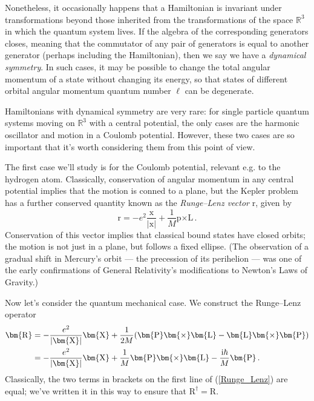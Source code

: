 \documentclass{article}
\theoremstyle{plain}\theoremheaderfont{\normalfont\itshape}\theorembodyfont{\rmfamily}\theoremseparator{.}\newtheorem*{rem}{Remark}\newtheorem*{ex}{Example}\newtheorem*{proof}{Proof}\newtheorem*{altp}{Alternative proof}
\theoremstyle{plain}\theoremheaderfont{\normalfont\bfseries}\theorembodyfont{\rmfamily}\theoremseparator{.}\newtheorem{thm}{Theorem}[section]\newtheorem{lem}[thm]{Lemma}\newtheorem{prop}[thm]{Proposition}\newtheorem*{cor}{Corollary}\newtheorem{defn}[thm]{Definition}\newtheorem{clm}[thm]{Claim}\newtheorem{clminproof}{Claim}
\theoremstyle{break}\theoremheaderfont{\normalfont\itshape}\theorembodyfont{\rmfamily}\theoremseparator{.\medskip}\newtheorem*{proofskip}{Proof}\newtheorem*{exs}{Examples}\newtheorem*{rems}{Remarks}
\theoremstyle{break}\theoremheaderfont{\normalfont\bfseries}\theorembodyfont{\rmfamily}\theoremseparator{.\medskip}\newtheorem{lemskip}[thm]{Lemma}\newtheorem{defnskip}[thm]{Definition}\newtheorem{propskip}[thm]{Proposition}\newtheorem{thmskip}[thm]{Theorem}
\numberwithin{equation}{section}
\newcommand{\ii}{\mathrm{i}}
\newcommand{\vb}[1]{\bm{\mathrm{#1}}}
\newcommand{\cross}{\bm{\times}}
\newcommand{\abs}[1]{\left| #1 \right|}
\newcommand{\RR}{\mathbb{R}}
\begin{document}
    Nonetheless, it occasionally happens that a Hamiltonian is invariant under transformations beyond those inherited from the transformations of the space \(\RR^3\) in which the quantum system lives. If the algebra of the corresponding generators closes, meaning that the commutator of any pair of generators is equal to another generator (perhaps including the Hamiltonian), then we say we have a \textit{dynamical symmetry}. In such cases, it may be possible to change the total angular momentum of a state without changing its energy, so that states of different orbital angular momentum quantum number \(\ell\) can be degenerate.

    Hamiltonians with dynamical symmetry are very rare: for single particle quantum systems moving on \(\RR^3\) with a central potential, the only cases are the harmonic oscillator and motion in a Coulomb potential. However, these two cases are so important that it's worth considering them from this point of view.

    The first case we'll study is for the Coulomb potential, relevant e.g. to the hydrogen atom. Classically, conservation of angular momentum in any central potential implies that the motion is conned to a plane, but the Kepler problem has a further conserved quantity known as the \textit{Runge--Lenz vector} \(\vb{r}\), given by
    \begin{equation}
        \vb{r}=-e^2\frac{\vb{x}}{\abs{\vb{x}}}+\frac{1}{M}\vb{p}\cross\vb{L}\,.
    \end{equation}
    Conservation of this vector implies that classical bound states have closed orbits; the motion is not just in a plane, but follows a fixed ellipse. (The observation of a gradual shift in Mercury's orbit --- the precession of its perihelion --- was one of the early confirmations of General Relativity's modifications to Newton's Laws of Gravity.)

    Now let's consider the quantum mechanical case. We construct the Runge--Lenz operator
    \begin{align}
        \vb{R}&=-\frac{e^2}{\abs{\vb{X}}}\vb{X}+\frac{1}{2M}(\vb{P}\cross\vb{L}-\vb{L}\cross\vb{P})\notag\\
        &=-\frac{e^2}{\abs{\vb{X}}}\vb{X}+\frac{1}{M}\vb{P}\cross\vb{L}-\frac{\ii\hbar}{M}\vb{P}\,.\label{Runge_Lenz}
    \end{align}
    Classically, the two terms in brackets on the first line of (\ref{Runge_Lenz}) are equal; we've written it in this way to ensure that \(\vb{R}^\dagger=\vb{R}\).
\end{document}
